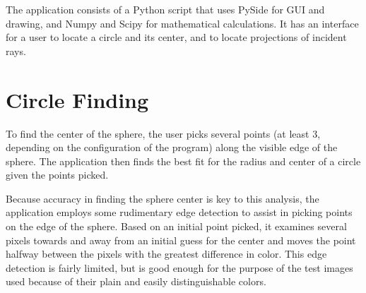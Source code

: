 \documentclass{thesis}
\begin{document}
The application consists of a Python script that uses PySide for GUI and drawing, and Numpy and Scipy for mathematical calculations. It has an interface for a user to locate a circle and its center, and to locate projections of incident rays.

\section{Circle Finding}
To find the center of the sphere, the user picks several points (at least 3, depending on the configuration of the program) along the visible edge of the sphere. The application then finds the best fit for the radius and center of a circle given the points picked.

Because accuracy in finding the sphere center is key to this analysis, the application employs some rudimentary edge detection to assist in picking points on the edge of the sphere. Based on an initial point picked, it examines several pixels towards and away from an initial guess for the center and moves the point halfway between the pixels with the greatest difference in color. This edge detection is fairly limited, but is good enough for the purpose of the test images used because of their plain and easily distinguishable colors.
\end{document}
